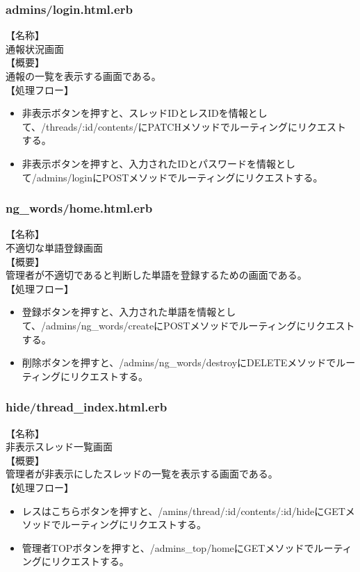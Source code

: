\documentclass[a4j]{jarticle}
\begin{document}
\subsubsection{admins/login.html.erb}
\noindent
【名称】\\
通報状況画面\\
【概要】\\
通報の一覧を表示する画面である。\\
【処理フロー】
\begin{itemize}
  \item 非表示ボタンを押すと、スレッドIDとレスIDを情報として、/threads/:id/contents/にPATCHメソッドでルーティングにリクエストする。
  \item 非表示ボタンを押すと、入力されたIDとパスワードを情報として/admins/loginにPOSTメソッドでルーティングにリクエストする。
\end{itemize}

\subsubsection{ng\_words/home.html.erb}
\noindent
【名称】\\
不適切な単語登録画面\\
【概要】\\
管理者が不適切であると判断した単語を登録するための画面である。\\
【処理フロー】
\begin{itemize}
  \item 登録ボタンを押すと、入力された単語を情報として、/admins/ng\_words/createにPOSTメソッドでルーティングにリクエストする。
  \item 削除ボタンを押すと、/admins/ng\_words/destroyにDELETEメソッドでルーティングにリクエストする。
\end{itemize}

\subsubsection{hide/thread\_index.html.erb}
\noindent
【名称】\\
非表示スレッド一覧画面\\
【概要】\\
管理者が非表示にしたスレッドの一覧を表示する画面である。\\
【処理フロー】
\begin{itemize}
  \item レスはこちらボタンを押すと、/amins/thread/:id/contents/:id/hideにGETメソッドでルーティングにリクエストする。
  \item 管理者TOPボタンを押すと、/admins\_top/homeにGETメソッドでルーティングにリクエストする。
\end{itemize}
\end{document}
